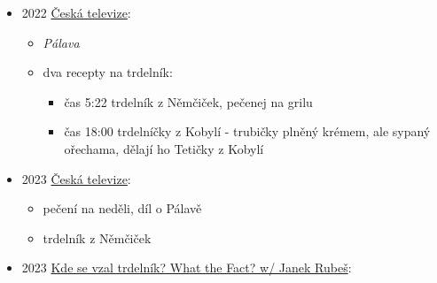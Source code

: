 \begin{itemize}
\begin{itemize}
    \begin{itemize}
    \tightlist
    \item
      v článku
      \href{https://reportermagazin.cz/79410/trdlokomedie-lukrativni-byznys-tahanice-a-tezke-vahy-v-pozadi/}{Trdlokomedie}
      z roku 2024 totiž říká, že ho viděl poprvý ve Štůrově na Slovensku
    \end{itemize}
  \item
    každopádně se tam prodával už hotovej, což mu přišlo jako škoda,
    takže si sestavil gril a válečky a začal experimentovat s těstem
  \item
    nejdřív prodával v Hostivaři u Intersparu, ale tam se mu nedařilo,
    pak začal jezdit na jarmarky po celý republice a tam už měl úspěch,
    v Praze hlavně na vánočních a velikonočních trzích, pak mohl pořídit
    i druhej stánek, zároveň začala vznikat konkurence
  \end{itemize}
\item
  2022
  \href{https://www.ceskatelevize.cz/porady/13889655314-peceni-na-nedeli/222544160510009/}{Česká
  televize}:

  \begin{itemize}
  \tightlist
  \item
    \emph{Pálava}
  \item
    dva recepty na trdelník:

    \begin{itemize}
    \tightlist
    \item
      čas 5:22 trdelník z Němčiček, pečenej na grilu
    \item
      čas 18:00 trdelníčky z Kobylí - trubičky plněný krémem, ale sypaný
      ořechama, dělají ho Tetičky z Kobylí
    \end{itemize}
  \end{itemize}
\item
  2023
  \href{https://www.ceskatelevize.cz/porady/13889655314-peceni-na-nedeli/222544160510009/cast/947232/}{Česká
  televize}:

  \begin{itemize}
  \tightlist
  \item
    pečení na neděli, díl o Pálavě
  \item
    trdelník z Němčiček
  \end{itemize}
\item
  2023 \href{https://www.youtube.com/watch?v=MPNEFr6O-Dw}{Kde se vzal
  trdelník? What the Fact? w/ Janek Rubeš}:


\end{itemize}
